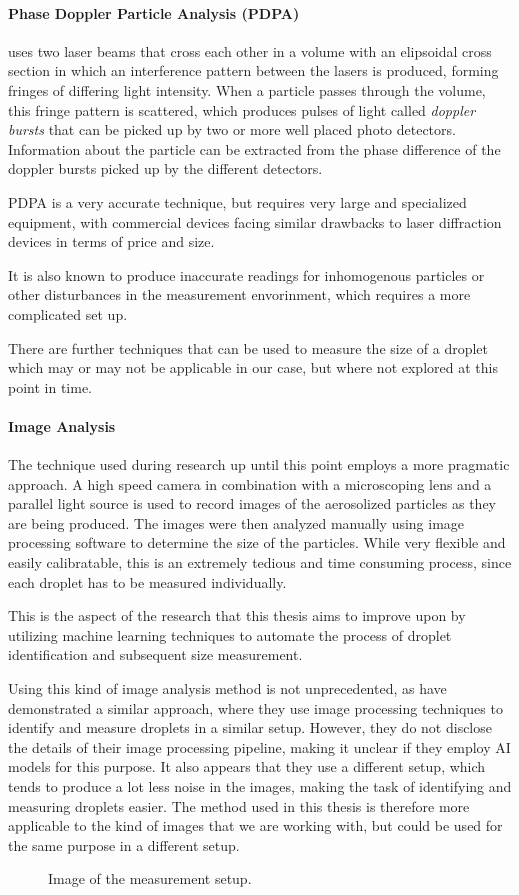 \paragraph{Phase Doppler Particle Analysis (PDPA)} uses two laser beams that cross each other in a volume with an elipsoidal cross section in which an interference pattern between the lasers is produced, forming fringes of differing light intensity. \cite{hollPARTICLEDEPOSITIONVELOCITIES}
When a particle passes through the volume, this fringe pattern is scattered, which produces pulses of light called \emph{doppler bursts} that can be picked up by two or more well placed photo detectors.
Information about the particle can be extracted from the phase difference of the doppler bursts picked up by the different detectors.

PDPA is a very accurate technique, but requires very large and specialized equipment, with commercial devices facing similar drawbacks to laser diffraction devices in terms of price and size.

It is also known to produce inaccurate readings for inhomogenous particles or other disturbances in the measurement envorinment, which requires a more complicated set up.

There are further techniques that can be used to measure the size of a droplet which may or may not be applicable in our case, but where not explored at this point in time. 

\paragraph{Image Analysis} 
The technique used during research up until this point employs a more pragmatic approach. A high speed camera in combination with a microscoping lens and a parallel light source is used to record images of the aerosolized particles as they are being produced. The images were then analyzed manually using image processing software to determine the size of the particles. While very flexible and easily calibratable, this is an extremely tedious and time consuming process, since each droplet has to be measured individually.

This is the aspect of the research that this thesis aims to improve upon by utilizing machine learning techniques to automate the process of droplet identification and subsequent size measurement.

Using this kind of image analysis method is not unprecedented, as  have demonstrated a similar approach, where they use image processing techniques to identify and measure droplets in a similar setup. 
However, they do not disclose the details of their image processing pipeline, making it unclear if they employ AI models for this purpose. 
It also appears that they use a different setup, which tends to produce a lot less noise in the images, making the task of identifying and measuring droplets easier.
The method used in this thesis is therefore more applicable to the kind of images that we are working with, but could be used for the same purpose in a different setup.

\begin{figure}[htbp]
    \centering
    \caption{Image of the measurement setup.}
    \label{fig:setup}
\end{figure}
